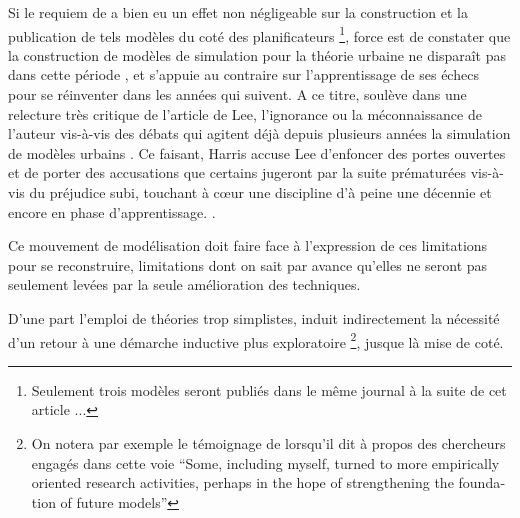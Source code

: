 Si le requiem de \textcite{Lee1973} a bien eu un effet non négligeable sur la construction et la publication de tels modèles du coté des planificateurs \footnote{Seulement trois modèles seront publiés dans le même journal à la suite de cet article ...}, force est de constater que la construction de modèles de simulation pour la théorie urbaine ne disparaît pas dans cette période \autocite[11-12]{Batty1994}, et s'appuie au contraire sur l'apprentissage de ses échecs pour se réinventer dans les années qui suivent. A ce titre, \textcite{Harris1994} soulève dans une relecture très critique de l'article de Lee, l'ignorance ou la méconnaissance de l'auteur vis-à-vis des débats qui agitent déjà depuis plusieurs années la simulation de modèles urbains \autocites{Batty1971, Wilson1970, Orcutt1957, Harris1968}. Ce faisant, Harris accuse Lee d'enfoncer des portes ouvertes et de porter des accusations que certains jugeront par la suite prématurées vis-à-vis du préjudice subi, touchant à cœur une discipline d'à peine une décennie et encore en phase d'apprentissage. \autocite[p11]{Batty1994}.

Ce mouvement de modélisation doit faire face à l'expression de ces limitations pour se reconstruire, limitations dont on sait par avance qu'elles ne seront pas seulement levées par la seule amélioration des techniques.  

D'une part l'emploi de théories trop simplistes, induit indirectement la nécessité d'un retour à une démarche inductive plus exploratoire \footnote{On notera par exemple le témoignage de \textcite{Boyce1988} lorsqu'il dit à propos des chercheurs engagés dans cette voie \foreignquote{english}{Some, including myself, turned to more empirically oriented research activities, perhaps in the hope of strengthening the foundation of future models}}, jusque là mise de coté. 

